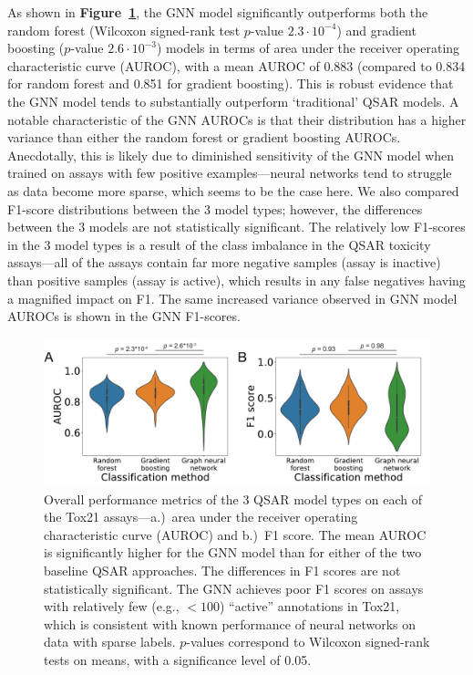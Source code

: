 \documentclass{ws-procs11x85}
\begin{document}
As shown in \textbf{Figure~\ref{fig:3}}, the GNN model significantly outperforms both the random forest (Wilcoxon signed-rank test $p$-value $2.3\cdot10^{-4}$) and gradient boosting ($p$-value $2.6\cdot10^{-3}$) models in terms of area under the receiver operating characteristic curve (AUROC), with a mean AUROC of 0.883 (compared to 0.834 for random forest and 0.851 for gradient boosting).
This is robust evidence that the GNN model tends to substantially outperform `traditional' QSAR models.
A notable characteristic of the GNN AUROCs is that their distribution has a higher variance than either the random forest or gradient boosting AUROCs.
Anecdotally, this is likely due to diminished sensitivity of the GNN model when trained on assays with few positive examples---neural networks tend to struggle as data become more sparse, which seems to be the case here.
We also compared F1-score distributions between the 3 model types; however, the differences between the 3 models are not statistically significant.
The relatively low F1-scores in the 3 model types is a result of the class imbalance in the QSAR toxicity assays---all of the assays contain far more negative samples (assay is inactive) than positive samples (assay is active), which results in any false negatives having a magnified impact on F1.
The same increased variance observed in GNN model AUROCs is shown in the GNN F1-scores.

\begin{figure}
   \centering
   \includegraphics[width=\textwidth]{figures/figure3.pdf}
   \caption{Overall performance metrics of the 3 QSAR model types on each of the Tox21 assays---a.)~area under the receiver operating characteristic curve (AUROC) and b.)~F1 score. The mean AUROC is significantly higher for the GNN model than for either of the two baseline QSAR approaches. The differences in F1 scores are not statistically significant. The GNN achieves poor F1 scores on assays with relatively few (e.g., $< 100$) ``active'' annotations in Tox21, which is consistent with known performance of neural networks on data with sparse labels. $p$-values correspond to Wilcoxon signed-rank tests on means, with a significance level of 0.05.}\label{fig:3}
\end{figure}
\end{document}
